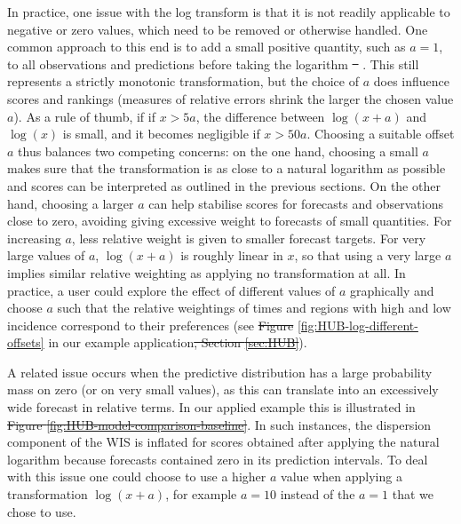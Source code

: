 \documentclass[10pt,letterpaper]{article} %
\providecommand{\DIFaddtex}[1]{{\protect\color{blue}\uwave{#1}}} %
\providecommand{\DIFdeltex}[1]{{\protect\color{red}\sout{#1}}}                      %
\providecommand{\DIFaddbegin}{} %
\providecommand{\DIFaddend}{} %
\providecommand{\DIFdelbegin}{} %
\providecommand{\DIFdelend}{} %
\providecommand{\DIFadd}[1]{\texorpdfstring{\DIFaddtex{#1}}{#1}} %
\providecommand{\DIFdel}[1]{\texorpdfstring{\DIFdeltex{#1}}{}} %
\newcommand{\DIFscaledelfig}{0.5}
\newlength{\DIFdelgraphicswidth} %
\newlength{\DIFdelgraphicsheight} %
\newcommand{\DIFaddincludegraphics}[2][]{{\color{blue}\fbox{\DIFOincludegraphics[#1]{#2}}}} %
\newcommand{\DIFdelincludegraphics}[2][]{%
\sbox{\DIFdelgraphicsbox}{\DIFOincludegraphics[#1]{#2}}%
\settoboxwidth{\DIFdelgraphicswidth}{\DIFdelgraphicsbox} %
\settoboxtotalheight{\DIFdelgraphicsheight}{\DIFdelgraphicsbox} %
\scalebox{\DIFscaledelfig}{%
\parbox[b]{\DIFdelgraphicswidth}{\usebox{\DIFdelgraphicsbox}\\[-\baselineskip] \rule{\DIFdelgraphicswidth}{0em}}\llap{\resizebox{\DIFdelgraphicswidth}{\DIFdelgraphicsheight}{%
\setlength{\unitlength}{\DIFdelgraphicswidth}%
\begin{picture}(1,1)%
\thicklines\linethickness{2pt} %
{\color[rgb]{1,0,0}\put(0,0){\framebox(1,1){}}}%
{\color[rgb]{1,0,0}\put(0,0){\line( 1,1){1}}}%
{\color[rgb]{1,0,0}\put(0,1){\line(1,-1){1}}}%
\end{picture}%
}\hspace*{3pt}}} %
} %
\DeclareRobustCommand{\DIFaddbegin}{\DIFOaddbegin \let\includegraphics\DIFaddincludegraphics} %
\DeclareRobustCommand{\DIFaddend}{\DIFOaddend \let\includegraphics\DIFOincludegraphics} %
\DeclareRobustCommand{\DIFdelbegin}{\DIFOdelbegin \let\includegraphics\DIFdelincludegraphics} %
\DeclareRobustCommand{\DIFdelend}{\DIFOaddend \let\includegraphics\DIFOincludegraphics} %
\begin{document}
In practice, one issue with the log transform is that it is not readily applicable to negative or zero values, which need to be removed or otherwise handled. 
One common approach to this end is to add a small positive quantity, such as $a = 1$, to all observations and predictions before taking the logarithm \DIFdelbegin \DIFdel{\mbox{%
\citep{bellegoDealingLogsZeros2022}}\hskip0pt%
}\DIFdelend \DIFaddbegin \DIFadd{\mbox{%
\cite{bellegoDealingLogsZeros2022}}\hskip0pt%
}\DIFaddend . This still represents a strictly monotonic transformation, but the choice of $a$ does influence scores and rankings (measures of relative errors shrink the larger the chosen value $a$). As a rule of thumb, if if $x > 5a$, the difference between $\log{(x + a)}$ and $\log{(x)}$ is small, and it becomes negligible if $x > 50a$. Choosing a suitable offset $a$ thus balances two competing concerns: on the one hand, choosing a small $a$ makes sure that the transformation is as close to a natural logarithm as possible and scores can be interpreted as outlined in the previous sections. On the other hand, choosing a larger $a$ can help stabilise scores for forecasts and observations close to zero, avoiding giving excessive weight to forecasts of small quantities. For increasing $a$, less relative weight is given to smaller forecast targets. For very large values of $a$, $\log(x + a)$ is roughly linear in $x$, so that using a very large $a$ implies similar relative weighting as applying no transformation at all. In practice, a user could explore the effect of different values of $a$ graphically and choose $a$ such that the relative weightings of times and regions with high and low incidence correspond to their preferences (see \DIFdelbegin \DIFdel{Figure }\DIFdelend \DIFaddbegin \DIFadd{Fig }\DIFaddend \ref{fig:HUB-log-different-offsets} in our example application\DIFdelbegin \DIFdel{, Section \ref{sec:HUB}}\DIFdelend ).


A related issue occurs when the predictive distribution has a large probability mass on zero (or on very small values), as this can translate into an excessively wide forecast in relative terms. In our applied example this is illustrated in \DIFdelbegin \DIFdel{Figure \ref{fig:HUB-model-comparison-baseline}}\DIFdelend \DIFaddbegin {}\DIFaddend . In such instances, the dispersion component of the WIS is inflated for scores obtained after applying the natural logarithm because forecasts contained zero in its prediction intervals. To deal with this issue one could choose to use a higher $a$ value when applying a transformation $\log(x + a)$, for example $a = 10$ instead of the $a = 1$ that we chose to use.
\end{document}
